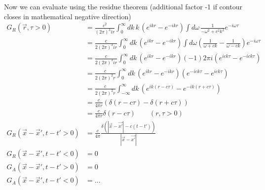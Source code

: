 \documentclass[../main.tex]{subfiles}
\begin{document}
\begin{itemize}
\begin{enumerate}
Now we can evaluate using the residue theorem (additional factor -1 if contour closes in mathematical negative direction)
\begin{align}
G_R(\vec{r},\tau>0)
&=\frac{c^2}{(2\pi)^3ir}\int_0^\infty dk\,k\,(e^{ikr}-e^{-ikr}) \int d\omega\,\frac{1}{-\omega^2+c^2k^2}e^{-i\omega\tau}\\
&=\frac{c}{2(2\pi)^3ir}\int_0^\infty dk\,(e^{ikr}-e^{-ikr}) \int d\omega\left(\frac{1}{\omega+ck}-\frac{1}{\omega-ck}\right)e^{-i\omega\tau}\\
&=\frac{c}{2(2\pi)^3ir}\int_0^\infty dk\,(e^{ikr}-e^{-ikr})(-1)2\pi i\left(e^{ick\tau}-e^{-ick\tau}\right)\\
&=\frac{c}{2(2\pi)^2r}\int_0^\infty dk\,(e^{ikr}-e^{-ikr})\left(e^{-ick\tau}-e^{ick\tau}\right)\\
&=\frac{c}{2(2\pi)^2r}\int_{-\infty}^\infty dk\,(e^{ik(r-c\tau)}-e^{-ik(r+c\tau)})\\
&=\frac{c}{4\pi r}\left(\delta(r-c\tau)-\delta(r+c\tau)\right)\\
&=\frac{c}{4\pi r}\delta(r-c\tau)\qquad(r,\tau>0)\\
G_R(\vec{x}-\vec{x}',t-t'>0)
&=\frac{c}{4\pi}\frac{\delta(|\vec{x}-\vec{x'}|-c(t-t'))}{|\vec{x}-\vec{x'}|}\\
G_R(\vec{x}-\vec{x}',t-t'<0)&=0\\
G_A(\vec{x}-\vec{x}',t-t'>0)&=0\\
G_A(\vec{x}-\vec{x}',t-t'<0)&=...
\end{align}
\end{enumerate}


\end{itemize}
\end{document}
